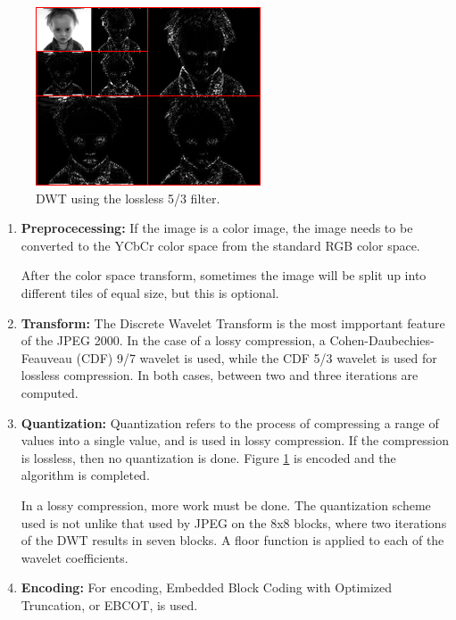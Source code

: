 \documentclass[12pt]{article}
\begin{document}
\begin{figure}[h]
	\centering
	\includegraphics[scale=0.6]{resources/losslessbaby.png}
	\caption{DWT using the lossless 5/3 filter.}
	\label{fig:losslessbaby}
\end{figure}

\begin{enumerate}
	
	\item\textbf{Preprocecessing:}
	If the image is a color image, the image needs to be converted to the YCbCr color space\cite{colorspace}
	from the standard RGB color space.

	After the color space transform, sometimes the image will be split up into different tiles of equal size,
	but this is optional.
	
	\item\textbf{Transform:}
	The Discrete Wavelet Transform is the most impportant feature of the JPEG 2000.
	In the case of a lossy compression, a Cohen-Daubechies-Feauveau (CDF) 9/7 wavelet is used,
	while the CDF 5/3 wavelet is used for lossless compression.
	In both cases, between two and three iterations are computed.
	
	\item\textbf{Quantization:}
	Quantization refers to the process of compressing a range of values into a single value,
	and is used in lossy compression.
	If the compression is lossless, then no quantization is done.
	Figure \ref{fig:losslessbaby} is encoded and the algorithm is completed.
	
	In a lossy compression, more work must be done.
	The quantization scheme used is not unlike that used by JPEG on the 8x8 blocks,
	where two iterations of the DWT results in seven blocks.
	A floor function is applied to each of the wavelet coefficients.
	
	\item\textbf{Encoding:}
	For encoding, Embedded Block Coding with Optimized Truncation, or EBCOT, is used.
	
\end{enumerate}
\end{document}
